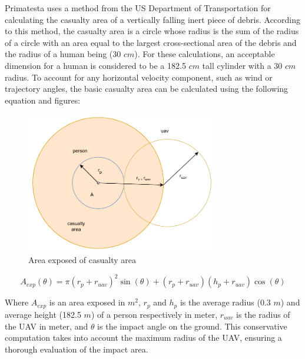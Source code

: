 \documentclass[12pt]{report}
\begin{document}
            Primatesta uses a method from the US Department of Transportation \cite{faa_expected_2000} for calculating
            the casualty area of a vertically falling inert piece of debris. According to this method, the casualty area
            is a circle whose radius is the sum of the radius of a circle with an area equal to the largest
            cross-sectional area of the debris and the radius of a human being (30 \(cm\)). For these calculations, an
            acceptable dimension for a human is considered to be a 182.5 \(cm\) tall cylinder with a 30 \(cm\) radius.
            To account for any horizontal velocity component, such as wind or trajectory angles, the basic casualty area
            can be calculated using the following equation and figures:

            \begin{figure}[H]
                \centering
                \includegraphics[width=0.75\textwidth]{General Image/OSM Drone-Area Exposed.pdf}
                \caption{Area exposed of casualty area}
            \end{figure}

            \begin{equation}
                A_{exp}(\theta) = \pi (r_p + r_{uav})^2 \sin (\theta) + (r_p + r_{uav})(h_p + r_{uav}) \cos (\theta)
            \end{equation}

            Where \(A_{exp}\) is an area exposed in \(m^2 \), $r_p$ and \(h_p\) is the average radius (0.3 \(m\)) and
            average height (182.5 \(m\)) of a person respectively in meter, $r_{uav}$ is the radius of the UAV in meter,
            and $\theta$ is the impact angle on the ground. This conservative computation takes into account the maximum
            radius of the UAV, ensuring a thorough evaluation of the impact area.
\end{document}

